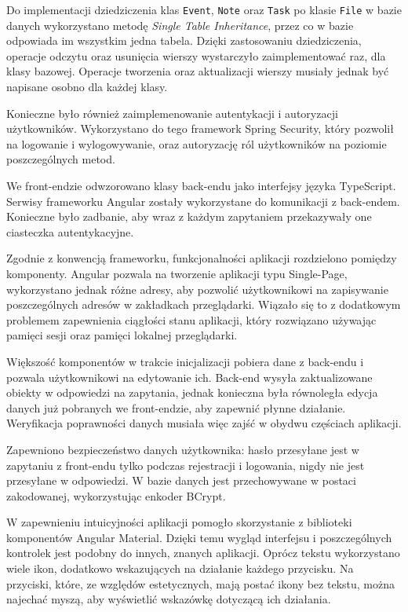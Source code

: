 \documentclass[a4paper,twoside,12pt]{book}
\newcommand{\obcy}[1]{\emph{#1}}
\newcommand{\english}[1]{{\selectlanguage{british}\obcy{#1}}}
\begin{document}
Do implementacji dziedziczenia klas \texttt{Event}, \texttt{Note} oraz \texttt{Task} po klasie \texttt{File} w bazie danych wykorzystano metodę \english{Single Table Inheritance}, przez co w bazie odpowiada im wszystkim jedna tabela. Dzięki zastosowaniu dziedziczenia, operacje odczytu oraz usunięcia wierszy wystarczyło zaimplementować raz, dla klasy bazowej. Operacje tworzenia oraz aktualizacji wierszy musiały jednak być napisane osobno dla każdej klasy.

Konieczne było również zaimplemenowanie autentykacji i autoryzacji użytkowników. Wykorzystano do tego framework Spring Security, który pozwolił na logowanie i wylogowywanie, oraz autoryzację ról użytkowników na poziomie poszczególnych metod.

We front-endzie odwzorowano klasy back-endu jako interfejsy języka TypeScript. Serwisy frameworku Angular zostały wykorzystane do komunikacji z back-endem. Konieczne było zadbanie, aby wraz z każdym zapytaniem przekazywały one ciasteczka autentykacyjne.

Zgodnie z konwencją frameworku, funkcjonalności aplikacji rozdzielono pomiędzy komponenty. Angular pozwala na tworzenie aplikacji typu Single-Page, wykorzystano jednak różne adresy, aby pozwolić użytkownikowi na zapisywanie poszczególnych adresów w zakładkach przeglądarki. Wiązało się to z dodatkowym problemem zapewnienia ciągłości stanu aplikacji, który rozwiązano używając pamięci sesji oraz pamięci lokalnej przeglądarki.

Większość komponentów w trakcie inicjalizacji pobiera dane z back-endu i pozwala użytkownikowi na edytowanie ich. Back-end wysyła zaktualizowane obiekty w odpowiedzi na zapytania, jednak konieczna była równoległa edycja danych już pobranych we front-endzie, aby zapewnić płynne działanie. Weryfikacja poprawności danych musiała więc zajść w obydwu częściach aplikacji.

Zapewniono bezpieczeństwo danych użytkownika: hasło przesyłane jest w zapytaniu z front-endu tylko podczas rejestracji i logowania, nigdy nie jest przesyłane w odpowiedzi. W bazie danych jest przechowywane w postaci zakodowanej, wykorzystując enkoder BCrypt.

W zapewnieniu intuicyjności aplikacji pomogło skorzystanie z biblioteki komponentów Angular Material. Dzięki temu wygląd interfejsu i poszczególnych kontrolek jest podobny do innych, znanych aplikacji. Oprócz tekstu wykorzystano wiele ikon, dodatkowo wskazujących na działanie każdego przycisku. Na przyciski, które, ze względów estetycznych, mają postać ikony bez tekstu, można najechać myszą, aby wyświetlić wskazówkę dotyczącą ich działania.
\end{document}
